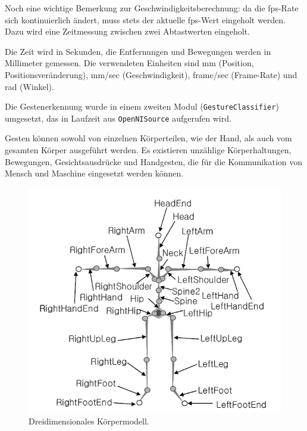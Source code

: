 Noch eine wichtige Bemerkung zur Geschwindigkeitsberechnung: da die \gls{fps}-Rate
 sich kontinuierlich ändert, muss stets der aktuelle \gls{fps}-Wert eingeholt werden.
 Dazu wird eine Zeitmessung zwischen zwei Abtastwerten eingeholt.

Die Zeit wird in Sekunden, die Entfernungen und Bewegungen werden in Millimeter gemessen.
 Die verwendeten Einheiten sind mm (Position, Positionsveränderung), mm/sec
 (Geschwindigkeit), frame/sec (Frame-Rate) und rad (Winkel).

Die Gestenerkennung wurde in einem zweiten Modul (\lstinline{GestureClassifier})
umgesetzt, das in Laufzeit aus \lstinline{OpenNISource} aufgerufen wird.

Gesten können sowohl von einzelnen Körperteilen, wie der Hand, als auch vom gesamten Körper ausgeführt werden. Es existieren unzählige Körperhaltungen, Bewegungen, Gesichtsausdrücke und Handgesten, die für die Kommunikation von Mensch und Maschine eingesetzt werden können.
\begin{figure}[h]
\label{fig:gesten_skelett}
\centering
\includegraphics[scale=0.7]{graphics/BILD-Skelett.png}
\caption{Dreidimensionales Körpermodell.}
\end{figure}

